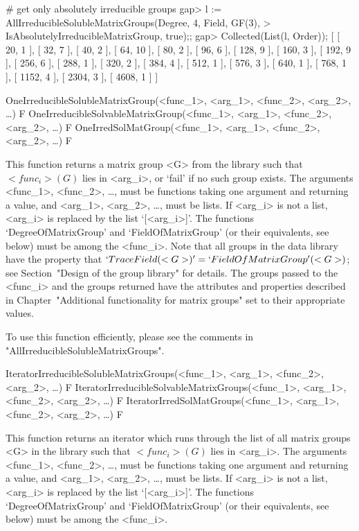 # get only absolutely irreducible groups
gap> l := AllIrreducibleSolubleMatrixGroups(Degree, 4, Field, GF(3),
> IsAbsolutelyIrreducibleMatrixGroup, true);;
gap> Collected(List(l, Order));
[ [ 20, 1 ], [ 32, 7 ], [ 40, 2 ], [ 64, 10 ], [ 80, 2 ], [ 96, 6 ], 
  [ 128, 9 ], [ 160, 3 ], [ 192, 9 ], [ 256, 6 ], [ 288, 1 ], [ 320, 2 ], 
  [ 384, 4 ], [ 512, 1 ], [ 576, 3 ], [ 640, 1 ], [ 768, 1 ], [ 1152, 4 ], 
  [ 2304, 3 ], [ 4608, 1 ] ]
\endexample

\>OneIrreducibleSolubleMatrixGroup(<func_1>, <arg_1>, <func_2>, <arg_2>, \dots) F
\>OneIrreducibleSolvableMatrixGroup(<func_1>, <arg_1>, <func_2>, <arg_2>, \dots) F
\>OneIrredSolMatGroup(<func_1>, <arg_1>, <func_2>, <arg_2>, \dots) F

This function returns a matrix group <G> from the {\IRREDSOL} library such that
$<func_i>(G)$ lies in <arg_i>, or `fail' if no such group exists. The arguments <func_1>,
<func_2>, \dots, must be {\GAP} functions taking one argument and returning a value, and
<arg_1>, <arg_2>, \dots,  must be lists. If <arg_i> is not a list, <arg_i> is replaced by
the list `[<arg_i>]'. The functions `DegreeOfMatrixGroup' and `FieldOfMatrixGroup' (or their equivalents, see below) must be among the <func_i>. 
 Note that all groups in the data library have the property that 
$`TraceField(<G>)' = `FieldOfMatrixGroup'(<G>)$; see Section~"Design of the group library" 
for details. 
The groups passed to the <func_i> and the groups returned have the attributes and properties described in 
Chapter~"Additional functionality for matrix groups" set to their appropriate values.

To use this function efficiently, please see the comments in 
"AllIrreducibleSolubleMatrixGroups".


\>IteratorIrreducibleSolubleMatrixGroups(<func_1>, <arg_1>, <func_2>, <arg_2>, \dots) F
\>IteratorIrreducibleSolvableMatrixGroups(<func_1>, <arg_1>, <func_2>, <arg_2>, \dots) F
\>IteratorIrredSolMatGroups(<func_1>, <arg_1>, <func_2>, <arg_2>, \dots) F

This function returns an iterator which runs through the list of all matrix groups <G>
in the  {\IRREDSOL} library such that
$<func_i>(G)$ lies in <arg_i>. The arguments <func_1>, <func_2>, \dots,
must be {\GAP} functions taking one argument and returning a value, and <arg_1>, <arg_2>, \dots, 
must be lists. If <arg_i> is not a list, <arg_i> is replaced by the list `[<arg_i>]'.
The functions `DegreeOfMatrixGroup' and `FieldOfMatrixGroup' (or their equivalents, see below) must be among the <func_i>. 


